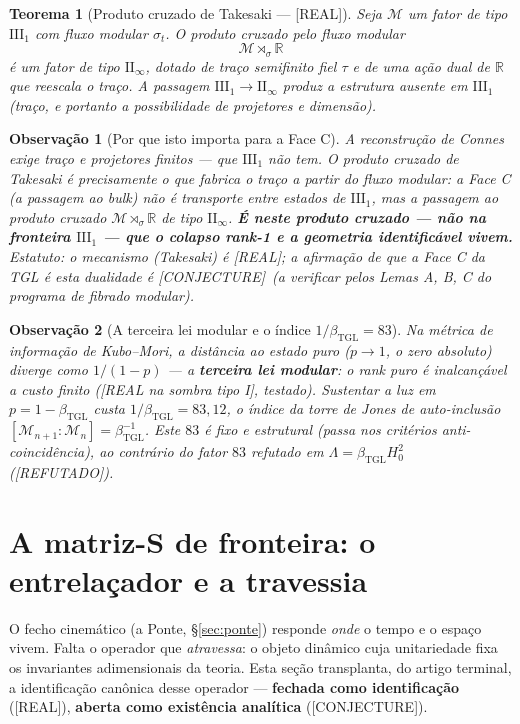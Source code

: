 \documentclass[11pt,a4paper]{article}
\newcommand{\REAL}{\textsf{[REAL]}}
\newcommand{\SOMBRA}{\textsf{[REAL na sombra tipo I]}}
\newcommand{\CONJ}{\textsf{[CONJECTURE]}}
\newcommand{\REF}{\textsf{[REFUTADO]}}
\newcommand{\bTGL}{\beta_{\mathrm{TGL}}}
\newtheorem{theorem}{Teorema}
\newtheorem{remark}{Observação}
\begin{document}
\begin{theorem}[Produto cruzado de Takesaki --- \REAL]
Seja $\mathcal M$ um fator de tipo $\mathrm{III}_1$ com fluxo modular
$\sigma_t$. O produto cruzado pelo fluxo modular
\begin{equation}
\mathcal M\rtimes_\sigma\mathbb R
\end{equation}
é um fator de tipo $\mathrm{II}_\infty$, dotado de traço semifinito fiel
$\tau$ e de uma ação dual de $\mathbb R$ que reescala o traço. A passagem
$\mathrm{III}_1\to\mathrm{II}_\infty$ \emph{produz} a estrutura ausente em
$\mathrm{III}_1$ (traço, e portanto a possibilidade de projetores e
dimensão).
\end{theorem}

\begin{remark}[Por que isto importa para a Face C]
A reconstrução de Connes exige traço e projetores finitos --- que
$\mathrm{III}_1$ \emph{não tem}. O produto cruzado de Takesaki é precisamente
o que fabrica o traço a partir do fluxo modular: a Face C (a passagem ao
bulk) \emph{não é} transporte entre estados de $\mathrm{III}_1$, mas a
passagem ao produto cruzado $\mathcal M\rtimes_\sigma\mathbb R$ de tipo
$\mathrm{II}_\infty$. \textbf{É neste produto cruzado --- não na fronteira
$\mathrm{III}_1$ --- que o colapso rank-1 e a geometria identificável
vivem.} Estatuto: o mecanismo (Takesaki) é \REAL; a afirmação de que a Face C
da TGL \emph{é} esta dualidade é \CONJ\ (a verificar pelos Lemas A, B, C do
programa de fibrado modular).
\end{remark}

\begin{remark}[A terceira lei modular e o índice $1/\bTGL=83$]
Na métrica de informação de Kubo--Mori, a distância ao estado puro
($p\to1$, o zero absoluto) diverge como $1/(1-p)$ --- a \textbf{terceira lei
modular}: o rank puro é inalcançável a custo finito (\SOMBRA, testado).
Sustentar a luz em $p=1-\bTGL$ custa $1/\bTGL=83{,}12$, o índice da torre de
Jones de auto-inclusão $[\mathcal M_{n+1}:\mathcal M_n]=\bTGL^{-1}$. Este
$83$ é \emph{fixo e estrutural} (passa nos critérios anti-coincidência), ao
contrário do fator $83$ refutado em $\Lambda=\bTGL H_0^2$ (\REF).
\end{remark}


\section{A matriz-S de fronteira: o entrelaçador e a travessia}\label{sec:smatrix}
O fecho cinemático (a Ponte, \S\ref{sec:ponte}) responde \emph{onde} o tempo
e o espaço vivem. Falta o operador que \emph{atravessa}: o objeto dinâmico
cuja unitariedade fixa os invariantes adimensionais da teoria. Esta seção
transplanta, do artigo terminal, a identificação canônica desse operador ---
\textbf{fechada como identificação} (\REAL), \textbf{aberta como existência
analítica} (\CONJ).
\end{document}
